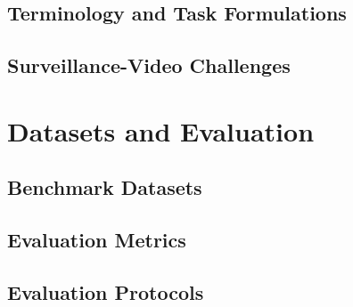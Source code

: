 \documentclass[11pt,a4paper]{article}
\begin{document}
    \subsection{Terminology and Task Formulations}
    \label{subsec:terminology-tasks}

    \subsection{Surveillance-Video Challenges}
    \label{subsec:surveillance-challenges}

    \section{Datasets and Evaluation}
    \label{sec:datasets-evaluation}

    \subsection{Benchmark Datasets}
    \label{subsec:benchmark-datasets}

    \subsection{Evaluation Metrics}
    \label{subsec:evaluation-metrics}

    \subsection{Evaluation Protocols}
    \label{subsec:evaluation-protocols}

\end{document}

